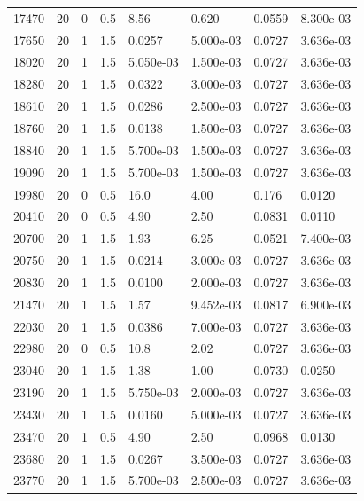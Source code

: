 \documentclass[preview]{standalone}
\begin{document}
{{{{{\begin{tabular}{L{1.2cm}C{1.2cm} C{0.3cm}C{0.5cm} C{1.4cm}C{1.4cm} C{1.4cm}C{1.4cm}}
  17470  &    20  & 0     & 0.5 &  8.56  & 0.620  & 0.0559 &  8.300e-03   \\ 
  17650  &    20  & 1     & 1.5 &  0.0257  & 5.000e-03  & 0.0727 &  3.636e-03   \\ 
  18020  &    20  & 1     & 1.5 &  5.050e-03  & 1.500e-03  & 0.0727 &  3.636e-03   \\ 
  18280  &    20  & 1     & 1.5 &  0.0322  & 3.000e-03  & 0.0727 &  3.636e-03   \\ 
  18610  &    20  & 1     & 1.5 &  0.0286  & 2.500e-03  & 0.0727 &  3.636e-03   \\ 
  18760  &    20  & 1     & 1.5 &  0.0138  & 1.500e-03  & 0.0727 &  3.636e-03   \\ 
  18840  &    20  & 1     & 1.5 &  5.700e-03  & 1.500e-03  & 0.0727 &  3.636e-03   \\ 
  19090  &    20  & 1     & 1.5 &  5.700e-03  & 1.500e-03  & 0.0727 &  3.636e-03   \\ 
  19980  &    20  & 0     & 0.5 &  16.0  & 4.00  & 0.176 &  0.0120   \\ 
  20410  &    20  & 0     & 0.5 &  4.90  & 2.50  & 0.0831 &  0.0110   \\ 
  20700  &    20  & 1     & 1.5 &  1.93  & 6.25  & 0.0521 &  7.400e-03   \\ 
  20750  &    20  & 1     & 1.5 &  0.0214  & 3.000e-03  & 0.0727 &  3.636e-03   \\ 
  20830  &    20  & 1     & 1.5 &  0.0100  & 2.000e-03  & 0.0727 &  3.636e-03   \\ 
  21470  &    20  & 1     & 1.5 &  1.57  & 9.452e-03  & 0.0817 &  6.900e-03   \\ 
  22030  &    20  & 1     & 1.5 &  0.0386  & 7.000e-03  & 0.0727 &  3.636e-03   \\ 
  22980  &    20  & 0     & 0.5 &  10.8  & 2.02  & 0.0727 &  3.636e-03   \\ 
  23040  &    20  & 1     & 1.5 &  1.38  & 1.00  & 0.0730 &  0.0250   \\ 
  23190  &    20  & 1     & 1.5 &  5.750e-03  & 2.000e-03  & 0.0727 &  3.636e-03   \\ 
  23430  &    20  & 1     & 1.5 &  0.0160  & 5.000e-03  & 0.0727 &  3.636e-03   \\ 
  23470  &    20  & 1     & 0.5 &  4.90  & 2.50  & 0.0968 &  0.0130   \\ 
  23680  &    20  & 1     & 1.5 &  0.0267  & 3.500e-03  & 0.0727 &  3.636e-03   \\ 
  23770  &    20  & 1     & 1.5 &  5.700e-03  & 2.500e-03  & 0.0727 &  3.636e-03   \\ 

\end{tabular}}}}}}
\end{document}

